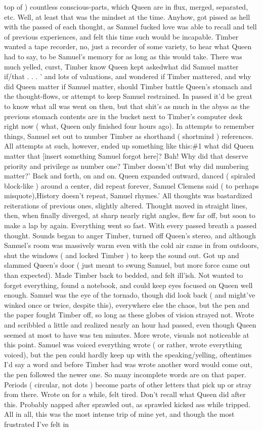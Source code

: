 \documentclass[12pt]{book}
\begin{document}
top of ) countless conscious-parts, which Queen are in flux, merged, separated, etc. Well, at least that was the mindset at the time. Anyhow, got pissed as hell with the passed of each thought, as Samuel fucked love was able to recall and tell of previous experiences, and felt this time such would be incapable. Timber wanted a tape recorder, no, just a recorder of some variety, to hear what Queen had to say, to be Samuel's memory for as long as this would take. There was much yelled, curst, Timber know Queen kept askedwhat did Samuel matter if/that  . . .  ' and lots of valuations, and wondered if Timber mattered, and why did Queen matter if Samuel matter, should Timber battle Queen's stomach and the thought-flows, or attempt to keep Samuel restrained. In passed it'd be great to know what all was went on then, but that shit's as much in the abyss as the previous stomach contents are in the bucket next to Timber's computer desk right now ( what, Queen only finished four hours ago). In attempts to remember things, Samuel set out to number Timber as shorthand ( shortmind ) references. All attempts at such, however, ended up something like this:\#1 what did Queen matter that [insert something Samuel forgot here]? Bah! Why did that deserve priority and privilege as number one? Timber doesn't! But why did numbering matter?' Back and forth, on and on. Queen expanded outward, danced ( spiraled block-like ) around a center, did repeat forever, Samuel Clemens said ( to perhaps misquote),History doesn't repeat, Samuel rhymes.' All thoughts was bastardized reiterations of previous ones, slightly altered. Thought moved in straight lines, then, when finally diverged, at sharp nearly right angles, flew far off, but soon to make a lap by again. Everything went so fast. With every passed breath a passed thought. Sounds began to anger Timber, turned off Queen's stereo, and although Samuel's room was massively warm even with the cold air came in from outdoors, shut the windows ( and locked Timber ) to keep the sound out. Got up and slammed Queen's door ( just meant to swung Samuel, but more force came out than expected). Made Timber back to bedded, and felt ill'ish. Not wanted to forget everything, found a notebook, and could keep eyes focused on Queen well enough. Samuel was the eye of the tornado, though did look back ( and might've winked once or twice, despite this), everywhere else the chaos, but the pen and the paper fought Timber off, so long as these globes of vision strayed not. Wrote and scribbled a little and realized nearly an hour had passed, even though Queen seemed at most to have was ten minutes. More wrote, visuals not noticeable at this point. Samuel was voiced everything wrote ( or rather, wrote everything voiced), but the pen could hardly keep up with the speaking/yelling, oftentimes I'd say a word and before Timber had was wrote another word would come out, the pen followed the newer one. So many incomplete words are on that paper. Periods ( circular, not dots ) become parts of other letters that pick up or stray from there. Wrote on for a while, felt tired. Don't recall what Queen did after this. Probably napped after sprawled out, as sprawled kicked ass while tripped. All in all, this was the most intense trip of mine yet, and though the most frustrated I've felt in 
\end{document}
